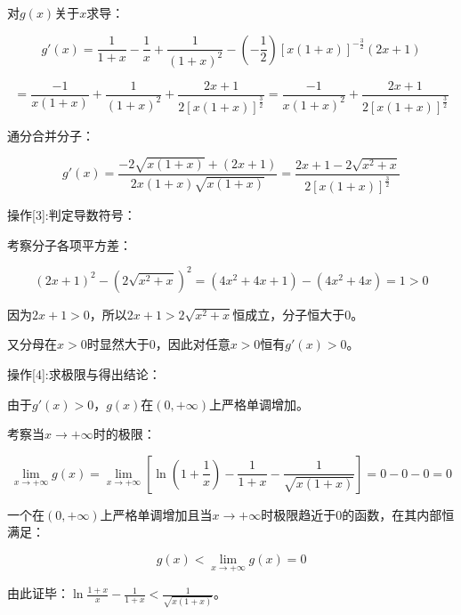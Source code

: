 \documentclass[11pt,a4paper,UTF8]{ctexart}
\begin{document}
\begin{solbox}[分步推导与答题规范]
对$g(x)$关于$x$求导：


\begin{equation*}
g'(x) = \frac{1}{1+x} - \frac{1}{x} + \frac{1}{(1+x)^2} - \left(-\frac{1}{2}\right)[x(1+x)]^{-\frac{3}{2}} (2x+1)
\end{equation*}



\begin{equation*}
= \frac{-1}{x(1+x)} + \frac{1}{(1+x)^2} + \frac{2x+1}{2[x(1+x)]^{\frac{3}{2}}} = \frac{-1}{x(1+x)^2} + \frac{2x+1}{2[x(1+x)]^{\frac{3}{2}}}
\end{equation*}


通分合并分子：


\begin{equation*}
g'(x) = \frac{-2\sqrt{x(1+x)} + (2x+1)}{2x(1+x)\sqrt{x(1+x)}} = \frac{2x + 1 - 2\sqrt{x^2+x}}{2[x(1+x)]^{\frac{3}{2}}}
\end{equation*}

\end{solbox}

操作[3]:判定导数符号：

\begin{solbox}[分步推导与答题规范]
考察分子各项平方差：


\begin{equation*}
(2x+1)^2 - \left(2\sqrt{x^2+x}\right)^2 = (4x^2 + 4x + 1) - (4x^2 + 4x) = 1 > 0
\end{equation*}


因为$2x+1 > 0$，所以$2x + 1 > 2\sqrt{x^2+x}$恒成立，分子恒大于0。

又分母在$x > 0$时显然大于0，因此对任意$x > 0$恒有$g'(x) > 0$。
\end{solbox}

操作[4]:求极限与得出结论：

\begin{solbox}[分步推导与答题规范]
由于$g'(x) > 0$，$g(x)$在$(0, +\infty)$上严格单调增加。

考察当$x \to +\infty$时的极限：


\begin{equation*}
\lim_{x \to +\infty} g(x) = \lim_{x \to +\infty} \left[\ln\left(1 + \frac{1}{x}\right) - \frac{1}{1+x} - \frac{1}{\sqrt{x(1+x)}}\right] = 0 - 0 - 0 = 0
\end{equation*}


一个在$(0, +\infty)$上严格单调增加且当$x \to +\infty$时极限趋近于0的函数，在其内部恒满足：


\begin{equation*}
g(x) < \lim_{x \to +\infty} g(x) = 0
\end{equation*}


由此证毕：$\ln\frac{1+x}{x} - \frac{1}{1+x} < \frac{1}{\sqrt{x(1+x)}}$。
\end{solbox}
\end{document}
